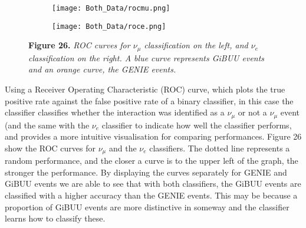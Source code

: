 \begin{figure}[t!]
 \begin{subfigure}{}
 \texttt{[image: Both\_Data/rocmu.png]}
  \end{subfigure}
   \begin{subfigure}{}
 \texttt{[image: Both\_Data/roce.png]}
  \end{subfigure}
  
 \textbf{Figure 26.} \textit{ROC curves for $\nu_\mu$ classification on the left, and $\nu_e$ classification on the right. A blue curve represents GiBUU events and an orange curve, the GENIE events.}
\end{figure}

\noindent Using a Receiver Operating Characteristic (ROC) curve, which plots the true positive rate against the false positive rate of a binary classifier, in this case the classifier classifies whether the interaction was identified as a $\nu_\mu$ or not a $\nu_\mu$ event (and the same with the $\nu_e$ classifier to indicate how well the classifier performs, and provides a more intuitive visualisation for comparing performances. Figure 26 show the ROC curves for $\nu_\mu$ and the $\nu_e$ classifiers. The dotted line represents a random performance, and the closer a curve is to the upper left of the graph, the stronger the performance. By displaying the curves separately for GENIE and GiBUU events we are able to see that with both classifiers, the GiBUU events are classified with a higher accuracy than the GENIE events. This may be because a proportion of  GiBUU events are more distinctive in someway and the classifier learns how to classify these.\medskip







